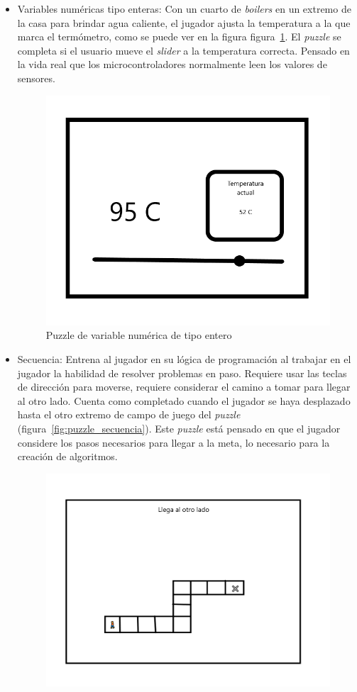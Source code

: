 \begin{itemize}
    \item Variables numéricas tipo enteras: Con un cuarto de \textit{boilers} en un extremo de la casa para brindar agua caliente, el jugador ajusta la temperatura a la que marca el termómetro, como se puede ver en la figura figura~\ref{fig:puzzle_int}. El \textit{puzzle} se completa si el usuario mueve el \textit{slider} a la temperatura correcta. Pensado en la vida real que los microcontroladores normalmente leen los valores de sensores.
    \begin{figure}[H]
        \centering
        \includegraphics[width=0.5\linewidth]{images/PuzzleInt.png}
        \caption{Puzzle de variable numérica de tipo entero }
        \label{fig:puzzle_int}
    \end{figure}
    \item Secuencia: Entrena al jugador en su lógica de programación al trabajar en el jugador la habilidad de resolver problemas en paso. Requiere usar las teclas de dirección para moverse, requiere considerar el camino a tomar para llegar al otro lado. Cuenta como completado cuando el jugador se haya desplazado hasta el otro extremo de campo de juego del \textit{puzzle} (figura~\ref{fig:puzzle_secuencia}). Este \textit{puzzle} está pensado en que el jugador considere los pasos necesarios para llegar a la meta, lo necesario para la creación de algoritmos.
    \begin{figure}[H]
        \centering
        \includegraphics[width=0.5\linewidth]{images/PuzzleSecuencia.png}

\end{figure}
\end{itemize}
